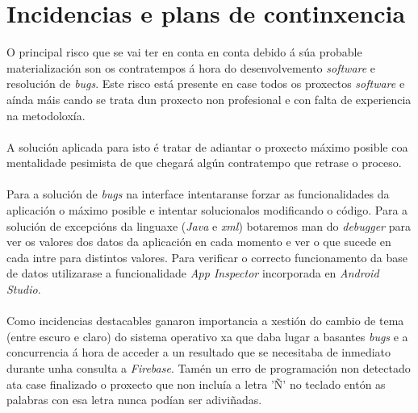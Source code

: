 \section{Incidencias e plans de continxencia}
O principal risco que se vai ter en conta en conta debido á súa probable materialización son os contratempos á hora do desenvolvemento \textit{software} e resolución de \textit{bugs}. Este risco está presente en case todos os proxectos \textit{software} e aínda máis cando se trata dun proxecto non profesional e con falta de experiencia na metodoloxía.\\
\\
A solución aplicada para isto é tratar de adiantar o proxecto máximo posible coa mentalidade pesimista de que chegará algún contratempo que retrase o proceso.\\
\\
Para a solución de \textit{bugs} na interface intentaranse forzar as funcionalidades da aplicación o máximo posible e intentar solucionalos modificando o código. Para a solución de excepcións da linguaxe (\textit{Java} e \textit{xml}) botaremos man do \textit{debugger} para ver os valores dos datos da aplicación en cada momento e ver o que sucede en cada intre para distintos valores. Para verificar o correcto funcionamento da base de datos utilizarase a funcionalidade \textit{App Inspector} incorporada en \textit{Android Studio}.\\
\\
Como incidencias destacables ganaron importancia a xestión do cambio de tema (entre escuro e claro) do sistema operativo xa que daba lugar a basantes \textit{bugs} e a concurrencia á hora de acceder a un resultado que se necesitaba de inmediato durante unha consulta a \textit{Firebase}. Tamén un erro de programación non detectado ata case finalizado o proxecto que non incluía a letra 'Ñ' no teclado entón as palabras con esa letra nunca podían ser adiviñadas.

 \let\cleardoublepage=\clearpage 